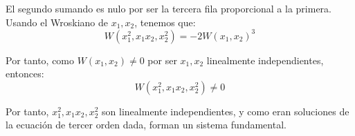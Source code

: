\begin{ejercicio}
\begin{enumerate}
        El segundo sumando es nulo por ser la tercera fila proporcional a la primera. Usando el Wroskiano de $x_1,x_2$, tenemos que:
        \begin{equation*}
            W(x_1^2,x_1x_2,x_2^2)=-2W(x_1,x_2)^3
        \end{equation*}

        Por tanto, como $W(x_1,x_2)\neq 0$ por ser $x_1,x_2$ linealmente independientes, entonces:
        \begin{equation*}
            W(x_1^2,x_1x_2,x_2^2)\neq 0
        \end{equation*}

        Por tanto, $x_1^2,x_1x_2,x_2^2$ son linealmente independientes, y como eran soluciones de la ecuación de tercer orden dada, forman un sistema fundamental.
    \end{enumerate}
\end{ejercicio}

